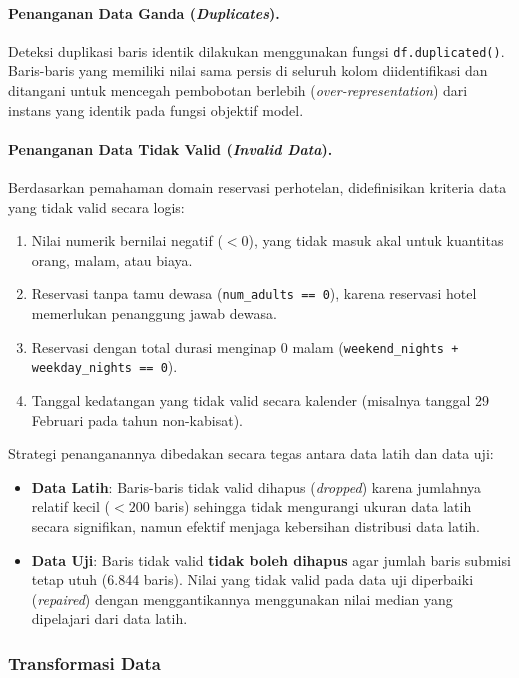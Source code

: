 \paragraph{Penanganan Data Ganda (\textit{Duplicates}).}
Deteksi duplikasi baris identik dilakukan menggunakan fungsi \texttt{df.duplicated()}. Baris-baris
yang memiliki nilai sama persis di seluruh kolom diidentifikasi dan ditangani untuk mencegah pembobotan
berlebih (\textit{over-representation}) dari instans yang identik pada fungsi objektif model.

\paragraph{Penanganan Data Tidak Valid (\textit{Invalid Data}).}
Berdasarkan pemahaman domain reservasi perhotelan, didefinisikan kriteria data yang tidak valid secara logis:
\begin{enumerate}
  \item Nilai numerik bernilai negatif ($< 0$), yang tidak masuk akal untuk kuantitas orang, malam, atau biaya.
  \item Reservasi tanpa tamu dewasa (\texttt{num\_adults == 0}), karena reservasi hotel memerlukan penanggung jawab dewasa.
  \item Reservasi dengan total durasi menginap 0 malam (\texttt{weekend\_nights + weekday\_nights == 0}).
  \item Tanggal kedatangan yang tidak valid secara kalender (misalnya tanggal 29 Februari pada tahun non-kabisat).
\end{enumerate}
Strategi penanganannya dibedakan secara tegas antara data latih dan data uji:
\begin{itemize}
  \item \textbf{Data Latih}: Baris-baris tidak valid dihapus (\textit{dropped}) karena jumlahnya relatif kecil
        ($< 200$ baris) sehingga tidak mengurangi ukuran data latih secara signifikan, namun efektif menjaga
        kebersihan distribusi data latih.
  \item \textbf{Data Uji}: Baris tidak valid \textbf{tidak boleh dihapus} agar jumlah baris submisi tetap utuh
        (6.844 baris). Nilai yang tidak valid pada data uji diperbaiki (\textit{repaired}) dengan menggantikannya
        menggunakan nilai median yang dipelajari dari data latih.
\end{itemize}

\subsubsection{Transformasi Data}

